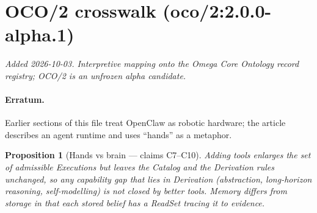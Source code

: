 \documentclass{article}
\newtheorem{proposition}{Proposition}
\begin{document}
\section{OCO/2 crosswalk (oco/2:2.0.0-alpha.1)}
\emph{Added 2026-10-03. Interpretive mapping onto the Omega Core Ontology
record registry; OCO/2 is an unfrozen alpha candidate.}
\paragraph{Erratum.} Earlier sections of this file treat OpenClaw as robotic hardware; the article describes an agent runtime and uses ``hands'' as a metaphor.

\begin{proposition}[Hands vs brain --- claims C7--C10]
Adding tools enlarges the set of admissible Executions but leaves the Catalog and the Derivation rules unchanged, so any capability gap that lies in Derivation (abstraction, long-horizon reasoning, self-modelling) is not closed by better tools. Memory differs from storage in that each stored belief has a ReadSet tracing it to evidence.
\end{proposition}
\end{document}
